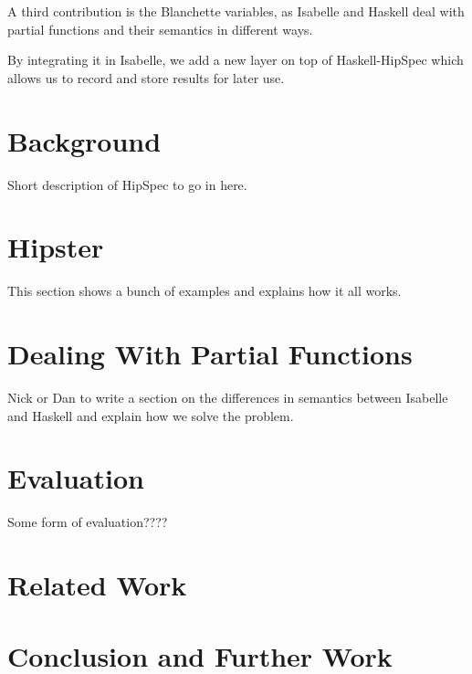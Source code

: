 \documentclass{llncs}
\begin{document}
A third contribution is the Blanchette variables, as Isabelle and Haskell deal with partial functions and their semantics in different ways.  

By integrating it in Isabelle, we add a new layer on top of Haskell-HipSpec which allows us to record and store results for later use.

\section{Background}
Short description of HipSpec to go in here.

\section{Hipster}
This section shows a bunch of examples and explains how it all works.

\section{Dealing With Partial Functions}
%
Nick or Dan to write a section on the differences in semantics between Isabelle and Haskell and explain how we solve the problem.

\section{Evaluation}
Some form of evaluation????

\section{Related Work}
%

\section{Conclusion and Further Work}
%



\end{document}
